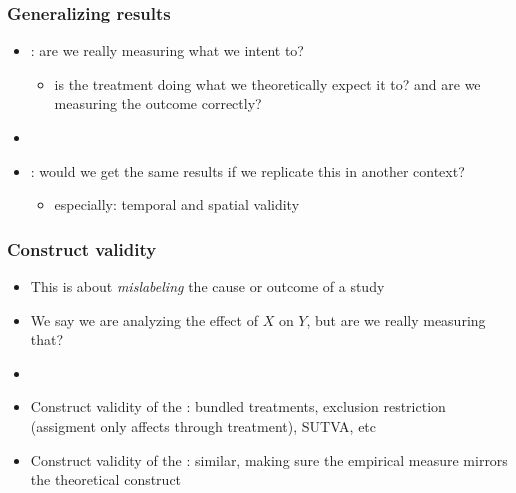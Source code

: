 \documentclass[aspectratio=43]{beamer}
\begin{document}
\begin{frame}
\frametitle{Generalizing results}
\centering

\begin{itemize}
  \item {}: are we really measuring what we intent to?
  \begin{itemize}
    \item is the treatment doing what we theoretically expect it to? and are we measuring the outcome correctly?
  \end{itemize}
  \item[]
  \item {}: would we get the same results if we replicate this in another context?
  \begin{itemize}
    \item especially: temporal and spatial validity
  \end{itemize}
\end{itemize}

\end{frame}

\begin{frame}
\frametitle{Construct validity}
\centering

\begin{itemize}
  \item This is about \textit{mislabeling} the cause or outcome of a study
  \item We say we are analyzing the effect of $X$ on $Y$, but are we really measuring that?
  \item[]
  \item<2->[1.] Construct validity of the : bundled treatments, exclusion restriction (assigment only affects through treatment), SUTVA, etc
  \item<3->[2.] Construct validity of the : similar, making sure the empirical measure mirrors the theoretical construct
\end{itemize}

\end{frame}
\end{document}
